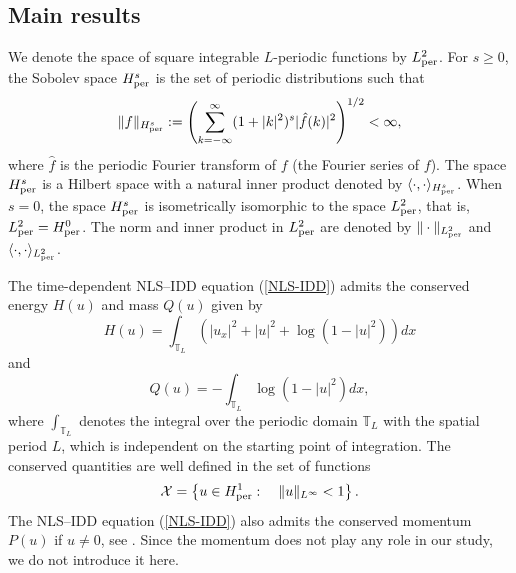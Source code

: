 \documentclass[12pt,reqno]{amsart}
\numberwithin{equation}{section}
\numberwithin{figure}{section}
\begin{document}
\subsection{Main results}

We denote the space of square integrable $L$-periodic functions by $L^2_{\rm per}$. For $s\geq0$, the Sobolev space $H^s_{\rm per}$ is the set of periodic distributions such that
$$
\|f\|_{H^s_{\rm per}} :=  \left( \sum_{k=-\infty}^{\infty}(1+|k|^2)^s|\hat{f}(k)|^2 \right)^{1/2} <\infty,
$$
where $\hat{f}$ is the periodic Fourier transform of $f$ (the Fourier series of $f$). The space $H^s_{\rm per}$ is a  Hilbert space with a natural inner product denoted by $\langle \cdot, \cdot \rangle_{H^s_{\rm per}}$. When $s=0$, the space $H^s_{\rm per}$ is isometrically isomorphic to the space  $L^2_{\rm per}$, that is, $L^2_{\rm per}=H^0_{\rm per}$. The norm and inner product in $L^2_{\rm per}$ are denoted by $\|\cdot \|_{L^2_{\rm per}}$ and $\langle \cdot, \cdot \rangle_{L^2_{\rm per}}$.

The time-dependent NLS--IDD equation (\ref{NLS-IDD}) admits the conserved energy $H(u)$ and mass $Q(u)$ given by 
\begin{equation}
H(u) = \int_{\mathbb{T}_L} \left( |u_x|^2+|u|^2+\log(1-|u|^2) \right) dx
\label{Eu}
\end{equation}
and
\begin{equation}
Q(u) = - \int_{\mathbb{T}_L} \log(1-|u|^2)dx, 
\label{Fu}
\end{equation}
where $\int_{\mathbb{T}_L}$ denotes the integral over the periodic domain $\mathbb{T}_L$ with the spatial period $L$, which is independent on the starting point of integration. The conserved quantities are well defined in the set of functions
$$
\mathcal{X} = \left\{ u \in H^1_{\rm per} : \quad \| u \|_{L^{\infty}} < 1 \right\}.
$$
The NLS--IDD equation (\ref{NLS-IDD}) also admits the conserved momentum $P(u)$ if $u \neq 0$, see \cite{KPR24}. Since the momentum does not play any role in our study, we do not introduce it here. 
\end{document}
